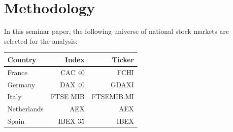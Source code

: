 \section{Methodology}
\label{sec:methodology}

In this seminar paper, the following universe of national stock markets are selected for the analysis:\\ 

\begin{tabular}{lrr}
\toprule
Country & Index & Ticker\\
\midrule
France & CAC 40 & FCHI\\
Germany & DAX 40 & GDAXI\\
Italy & FTSE MIB & FTSEMIB.MI\\
Netherlands & AEX & AEX\\
Spain & IBEX 35 & IBEX\\
\bottomrule
\end{tabular}